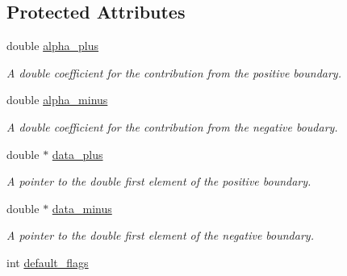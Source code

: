\subsection*{Protected Attributes}
\begin{DoxyCompactItemize}
\item 
\hypertarget{classbases_1_1boundary_ae8f89a95a1de719bb6e129baacad6608}{double \hyperlink{classbases_1_1boundary_ae8f89a95a1de719bb6e129baacad6608}{alpha\-\_\-plus}}\label{classbases_1_1boundary_ae8f89a95a1de719bb6e129baacad6608}

\begin{DoxyCompactList}\small\item\em A double coefficient for the contribution from the positive boundary. \end{DoxyCompactList}\item 
\hypertarget{classbases_1_1boundary_a6a803a528f5a1da90f2fe0712f84d9ab}{double \hyperlink{classbases_1_1boundary_a6a803a528f5a1da90f2fe0712f84d9ab}{alpha\-\_\-minus}}\label{classbases_1_1boundary_a6a803a528f5a1da90f2fe0712f84d9ab}

\begin{DoxyCompactList}\small\item\em A double coefficient for the contribution from the negative boudary. \end{DoxyCompactList}\item 
\hypertarget{classbases_1_1boundary_a2fd402f9f4afb17f6e5626a50ccf0eb0}{double $\ast$ \hyperlink{classbases_1_1boundary_a2fd402f9f4afb17f6e5626a50ccf0eb0}{data\-\_\-plus}}\label{classbases_1_1boundary_a2fd402f9f4afb17f6e5626a50ccf0eb0}

\begin{DoxyCompactList}\small\item\em A pointer to the double first element of the positive boundary. \end{DoxyCompactList}\item 
\hypertarget{classbases_1_1boundary_a09840c8fc50048b3284b5ace7b3e983c}{double $\ast$ \hyperlink{classbases_1_1boundary_a09840c8fc50048b3284b5ace7b3e983c}{data\-\_\-minus}}\label{classbases_1_1boundary_a09840c8fc50048b3284b5ace7b3e983c}

\begin{DoxyCompactList}\small\item\em A pointer to the double first element of the negative boundary. \end{DoxyCompactList}\item 
\hypertarget{classbases_1_1plan_a756595e230cc99e84de4392ac691eefd}{int \hyperlink{classbases_1_1plan_a756595e230cc99e84de4392ac691eefd}{default\-\_\-flags}}\label{classbases_1_1plan_a756595e230cc99e84de4392ac691eefd}


\end{DoxyCompactItemize}
